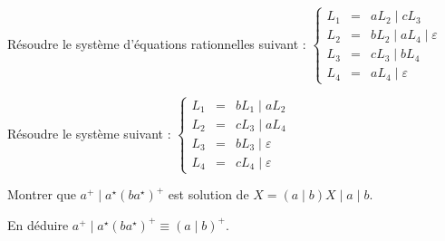 
\begingroup

\begin{exercice}\label{exo:lexing/arden/revision}

  \begin{questions}

  \item Résoudre le système d'équations rationnelles suivant :
    $\left\{
    \begin{array}{rcl}
      L_1 &=& aL_2 \mid cL_3 \\
      L_2 &=& bL_2 \mid aL_4 \mid \varepsilon \\
      L_3 &=& cL_3 \mid bL_4 \\
      L_4 &=& aL_4 \mid \varepsilon
    \end{array}
    \right.$

  \item Résoudre le système suivant :
    $\left\{
    \begin{array}{rcl}
      L_1 &=& bL_1 \mid aL_2 \\
      L_2 &=& cL_3 \mid aL_4 \\
      L_3 &=& bL_3 \mid \varepsilon \\
      L_4 &=& cL_4 \mid \varepsilon
    \end{array}
    \right.$

  \item Montrer que $a^+ \mid  a^\star  (ba^\star )^+$ est solution de $X = (a \mid b) X \mid a\mid b$.
  \item En déduire $a^+ \mid  a^\star  (ba^\star )^+ \equiv (a\mid b)^+$. 
  \end{questions}

\end{exercice}

